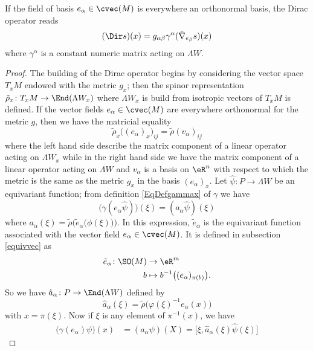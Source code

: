 \begin{proposition}
If the field of basis $e_{\alpha}\in\cvec(M)$ is everywhere an orthonormal basis, the Dirac operator reads
\begin{equation}
(\Dir s)(x)=g_{\alpha\beta}\gamma^{\alpha}(\tilde\nabla_{e_{\beta}}s)(x)
\end{equation}
where $\gamma^{\alpha}$ is a constant numeric matrix acting on $\Lambda W$.
\end{proposition}

\begin{proof}
The building of the Dirac operator begins by considering the vector space $T_xM$ endowed with the metric $g_x$; then the spinor representation $\tilde\rho_x\colon T_xM\to \End(\Lambda W_x)$ where $\Lambda W_x$ is build from isotropic vectors of $T_xM$ is defined. If the vector fields $e_{\alpha}\in\cvec(M)$ are everywhere orthonormal for the metric $g$, then we have the matricial equality
\begin{equation}
	\tilde\rho_x\big( (e_{\alpha})_x \big)_{ij}=\tilde\rho(v_{\alpha})_{ij}
\end{equation}
where the left hand side describe the matrix component of a linear operator acting on $\Lambda W_x$ while in the right hand side we have the matrix component of a linear operator acting on $\Lambda W$ and $v_{\alpha}$ is a basis on $\eR^n$ with respect to which the metric is the same as the metric $g_x$ in the basis $(e_{\alpha})_x$. Let $\hat{\psi}\colon P\to \Lambda W$ be an equivariant function; from definition \eqref{EqDefgammax} of $\gamma$ we have
\[ 
  \big( \gamma(e_{\alpha}\hat{\psi}) \big)(\xi)=(a_{\alpha}\hat{\psi})(\xi)
\]
where $a_{\alpha}(\xi)=\tilde\rho\Big( \tilde{e}_{\alpha}\big( \phi(\xi) \big) \Big)$. In this expression, $\tilde{e}_{\alpha}$ is the equivariant function associated with the vector field $e_{\alpha}\in\cvec(M)$. It is defined in subsection \ref{equivvec} as
\begin{equation}
\begin{aligned}
 \tilde{e}_{\alpha}\colon \SO(M)&\to \eR^m \\ 
b&\mapsto b^{-1}\big( (e_{\alpha})_{\pi(b)} \big). 
\end{aligned}
\end{equation}
So we have $\hat a_{\alpha}\colon P\to \End(\Lambda W)$ defined by
\[ 
  \hat a_{\alpha}(\xi)=\tilde\rho\big( \varphi(\xi)^{-1}e_{\alpha}(x) \big)
\]
with $x=\pi(\xi)$. Now if $\xi$ is any element of $\pi^{-1}(x)$, we have
\begin{align*}
\big( \gamma(e_{\alpha})\psi \big)(x)&=(a_{\alpha}\psi)(X)=\big[ \xi,\hat a_{\alpha}(\xi)\hat\psi(\xi) \big]

\end{align*}
\end{proof}
